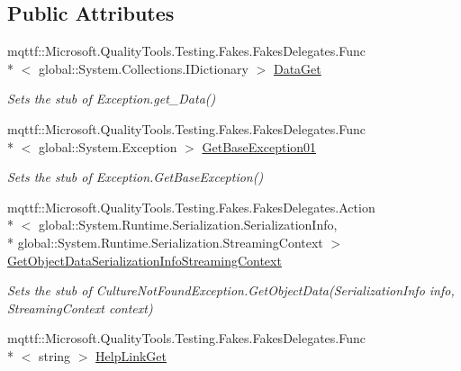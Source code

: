 \subsection*{Public Attributes}
\begin{DoxyCompactItemize}
\item 
mqttf\-::\-Microsoft.\-Quality\-Tools.\-Testing.\-Fakes.\-Fakes\-Delegates.\-Func\\*
$<$ global\-::\-System.\-Collections.\-I\-Dictionary $>$ \hyperlink{class_system_1_1_globalization_1_1_fakes_1_1_stub_culture_not_found_exception_a657b94fe41ee00f4ed7487ffe87936fb}{Data\-Get}
\begin{DoxyCompactList}\small\item\em Sets the stub of Exception.\-get\-\_\-\-Data()\end{DoxyCompactList}\item 
mqttf\-::\-Microsoft.\-Quality\-Tools.\-Testing.\-Fakes.\-Fakes\-Delegates.\-Func\\*
$<$ global\-::\-System.\-Exception $>$ \hyperlink{class_system_1_1_globalization_1_1_fakes_1_1_stub_culture_not_found_exception_a826452c1b24148075ca1fcbcf19b6a49}{Get\-Base\-Exception01}
\begin{DoxyCompactList}\small\item\em Sets the stub of Exception.\-Get\-Base\-Exception()\end{DoxyCompactList}\item 
mqttf\-::\-Microsoft.\-Quality\-Tools.\-Testing.\-Fakes.\-Fakes\-Delegates.\-Action\\*
$<$ global\-::\-System.\-Runtime.\-Serialization.\-Serialization\-Info, \\*
global\-::\-System.\-Runtime.\-Serialization.\-Streaming\-Context $>$ \hyperlink{class_system_1_1_globalization_1_1_fakes_1_1_stub_culture_not_found_exception_a8fe23a26a78a3dc11a7694285b378995}{Get\-Object\-Data\-Serialization\-Info\-Streaming\-Context}
\begin{DoxyCompactList}\small\item\em Sets the stub of Culture\-Not\-Found\-Exception.\-Get\-Object\-Data(\-Serialization\-Info info, Streaming\-Context context)\end{DoxyCompactList}\item 
mqttf\-::\-Microsoft.\-Quality\-Tools.\-Testing.\-Fakes.\-Fakes\-Delegates.\-Func\\*
$<$ string $>$ \hyperlink{class_system_1_1_globalization_1_1_fakes_1_1_stub_culture_not_found_exception_a1b33fdecaaff84d9504105f5d52b2a84}{Help\-Link\-Get}

\end{DoxyCompactItemize}

